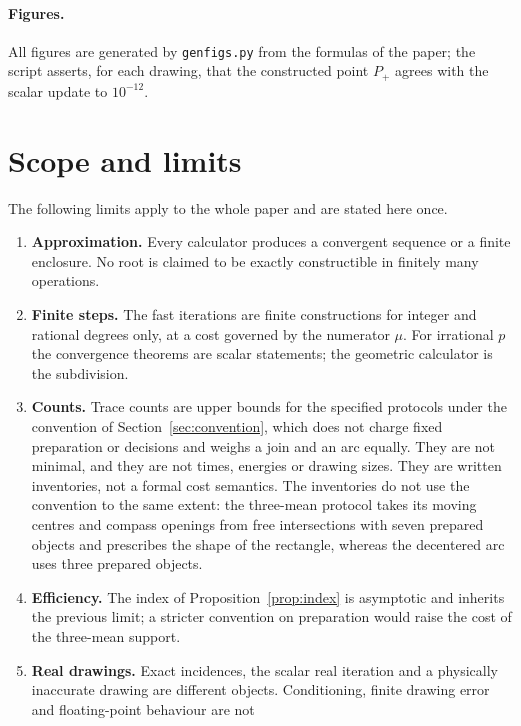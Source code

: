 \paragraph{Figures.}
All figures are generated by \texttt{genfigs.py} from the formulas of the paper; the script asserts, for
each drawing, that the constructed point $P_+$ agrees with the scalar update to $10^{-12}$.

\section{Scope and limits}\label{sec:limits}

The following limits apply to the whole paper and are stated here once.
\begin{enumerate}[label=\arabic*.]
\item \textbf{Approximation.} Every calculator produces a convergent sequence or a finite enclosure. No
  root is claimed to be exactly constructible in finitely many operations.
\item \textbf{Finite steps.} The fast iterations are finite constructions for integer and rational
  degrees only, at a cost governed by the numerator $\mu$. For irrational $p$ the convergence theorems
  are scalar statements; the geometric calculator is the subdivision.
\item \textbf{Counts.} Trace counts are upper bounds for the specified protocols under the convention of
  Section~\ref{sec:convention}, which does not charge fixed preparation or decisions and weighs a join
  and an arc equally. They are not minimal, and they are not times, energies or drawing sizes. They are
  written inventories, not a formal cost semantics. The inventories do not use the convention to the
  same extent: the three-mean protocol takes its moving centres and compass openings from free
  intersections with seven prepared objects and prescribes the shape of the rectangle, whereas the
  decentered arc uses three prepared objects.
\item \textbf{Efficiency.} The index of Proposition~\ref{prop:index} is asymptotic and inherits the
  previous limit; a stricter convention on preparation would raise the cost of the three-mean
  support.
\item \textbf{Real drawings.} Exact incidences, the scalar real iteration and a physically inaccurate
  drawing are different objects. Conditioning, finite drawing error and floating-point behaviour are not

\end{enumerate}
